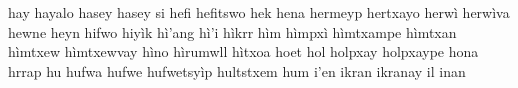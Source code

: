 \documentclass[a4paper]{article}
\begin{document}
hay\hspace{2mm}
hayalo\hspace{2mm}
hasey\hspace{2mm}
hasey si\hspace{2mm}
hefi\hspace{2mm}
hefitswo\hspace{2mm}
hek\hspace{2mm}
hena\hspace{2mm}
hermeyp\hspace{2mm}
hertxayo\hspace{2mm}
herwì\hspace{2mm}
herwìva\hspace{2mm}
hewne\hspace{2mm}
heyn\hspace{2mm}
hifwo\hspace{2mm}
hiyìk\hspace{2mm}
hì'ang\hspace{2mm}
hì'i\hspace{2mm}
hìkrr\hspace{2mm}
hìm\hspace{2mm}
hìmpxì\hspace{2mm}
hìmtxampe\hspace{2mm}
hìmtxan\hspace{2mm}
hìmtxew\hspace{2mm}
hìmtxewvay\hspace{2mm}
hìno\hspace{2mm}
hìrumwll\hspace{2mm}
hìtxoa\hspace{2mm}
hoet\hspace{2mm}
hol\hspace{2mm}
holpxay\hspace{2mm}
holpxaype\hspace{2mm}
hona\hspace{2mm}
hrrap\hspace{2mm}
hu\hspace{2mm}
hufwa\hspace{2mm}
hufwe\hspace{2mm}
hufwetsyìp\hspace{2mm}
hultstxem\hspace{2mm}
hum\hspace{2mm}
i'en\hspace{2mm}
ikran\hspace{2mm}
ikranay\hspace{2mm}
il\hspace{2mm}
inan\hspace{2mm}
\end{document}
